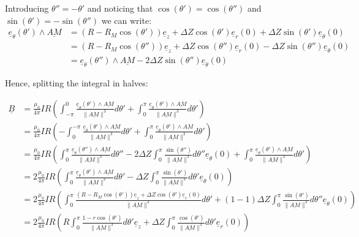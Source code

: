\documentclass[a4paper,11pt,twoside,titlepage,openright]{book}
\numberwithin{equation}{section}
\newcommand{\ud}[1]{\underline{#1}}
\begin{document}
Introducing $\theta''=-\theta'$
and noticing that $\cos(\theta')=\cos(\theta'')$
and $\sin(\theta')=-\sin(\theta'')$ we can write:
$$
\begin{array}{ll}
    \ud{e}_{\theta}(\theta')\wedge\ud{AM}
    & = (R-R_M\cos(\theta'))\ud{e}_z
    + \Delta Z\cos(\theta')\ud{e}_r(0) + \Delta Z\sin(\theta')\ud{e}_{\theta}(0)\\
    & = (R-R_M\cos(\theta''))\ud{e}_z
    + \Delta Z\cos(\theta'')\ud{e}_r(0) - \Delta Z\sin(\theta'')\ud{e}_{\theta}(0)\\
    & = \ud{e}_{\theta}(\theta'')\wedge\ud{AM} - 2\Delta Z\sin(\theta'')\ud{e}_{\theta}(0)
\end{array}
$$

Hence, splitting the integral in halves:


$$
\begin{array}{ll}
    \ud{B}
    & = \frac{\mu_0}{4\pi}IR\left(
    \int_{-\pi}^{0}
    \frac{\ud{e}_{\theta}(\theta')\wedge\ud{AM}}{\| \ud{AM} \|^3}d\theta'
    + \int_{0}^{\pi}
    \frac{\ud{e}_{\theta}(\theta')\wedge\ud{AM}}{\| \ud{AM} \|^3}d\theta'
    \right)\\
    & = \frac{\mu_0}{4\pi}IR\left(
    -\int_{0}^{-\pi}
    \frac{\ud{e}_{\theta}(\theta')\wedge\ud{AM}}{\| \ud{AM} \|^3}d\theta'
    + \int_{0}^{\pi}
    \frac{\ud{e}_{\theta}(\theta')\wedge\ud{AM}}{\| \ud{AM} \|^3}d\theta'
    \right)\\
    & = \frac{\mu_0}{4\pi}IR\left(
    \int_{0}^{\pi}
    \frac{\ud{e}_{\theta}(\theta'')\wedge\ud{AM}}{\| \ud{AM} \|^3}d\theta''
    - 2\Delta Z\int_{0}^{\pi}\frac{\sin(\theta'')}{\| \ud{AM} \|^3}d\theta''\ud{e}_{\theta}(0)
    + \int_{0}^{\pi}
    \frac{\ud{e}_{\theta}(\theta')\wedge\ud{AM}}{\| \ud{AM} \|^3}d\theta'
    \right)\\
    & = 2\frac{\mu_0}{4\pi}IR\left(
    \int_{0}^{\pi}
    \frac{\ud{e}_{\theta}(\theta')\wedge\ud{AM}}{\| \ud{AM} \|^3}d\theta'
    - \Delta Z\int_{0}^{\pi}\frac{\sin(\theta')}{\| \ud{AM} \|^3}d\theta'\ud{e}_{\theta}(0)
    \right)\\
    & = 2\frac{\mu_0}{4\pi}IR\left(
    \int_{0}^{\pi}
    \frac{(R-R_M\cos(\theta'))\ud{e}_z + \Delta Z\cos(\theta')\ud{e}_r(0)}{\| \ud{AM} \|^3}d\theta'
    + (1-1)\Delta Z\int_{0}^{\pi}\frac{\sin(\theta')}{\| \ud{AM} \|^3}d\theta''\ud{e}_{\theta}(0)
    \right)\\
    & = 2\frac{\mu_0}{4\pi}IR\left(
    R\int_{0}^{\pi}\frac{1-r\cos(\theta')}{\| \ud{AM} \|^3}d\theta'\ud{e}_z
    + \Delta Z\int_{0}^{\pi}\frac{\cos(\theta')}{\| \ud{AM} \|^3}d\theta'\ud{e}_r(0)
    \right)\\
\end{array}
$$
\end{document}
